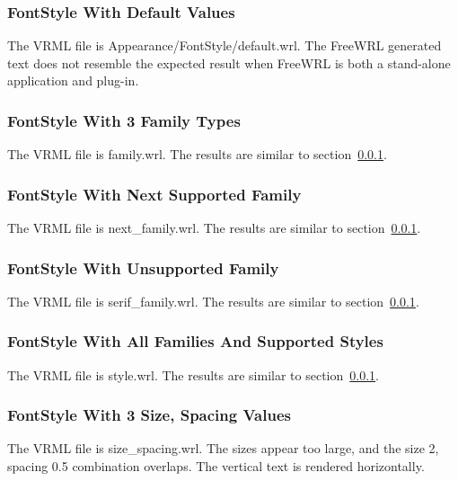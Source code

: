 \documentclass[12pt,letterpaper]{article}
\newcommand{\FSA}{FontStyle With Default Values}
\newcommand{\FSB}{FontStyle With 3 Family Types}
\newcommand{\FSC}{FontStyle With Next Supported Family}
\newcommand{\FSD}{FontStyle With Unsupported Family}
\newcommand{\FSE}{FontStyle With All Families And Supported Styles}
\newcommand{\FSF}{FontStyle With 3 Size, Spacing Values}
\begin{document}
\subsubsection{\FSA}
\label{sec:fs-default}
The VRML file is Appearance/FontStyle/default.wrl.
The FreeWRL generated text does not resemble the expected result when FreeWRL is both
a stand-alone application and plug-in.

\subsubsection{\FSB}
\label{sec:3-families}
The VRML file is family.wrl.\newline
The results are similar to section~\ref{sec:fs-default}.

\subsubsection{\FSC}
The VRML file is next\_family.wrl.\newline
The results are similar to section~\ref{sec:fs-default}.

\subsubsection{\FSD}
The VRML file is serif\_family.wrl.\newline
The results are similar to section~\ref{sec:fs-default}.

\subsubsection{\FSE}
The VRML file is style.wrl.\newline
The results are similar to section~\ref{sec:fs-default}.

\subsubsection{\FSF}
The VRML file is size\_spacing.wrl.\newline
The sizes appear too large, and the size 2, spacing 0.5 combination overlaps.
The vertical text is rendered horizontally.
\end{document}
